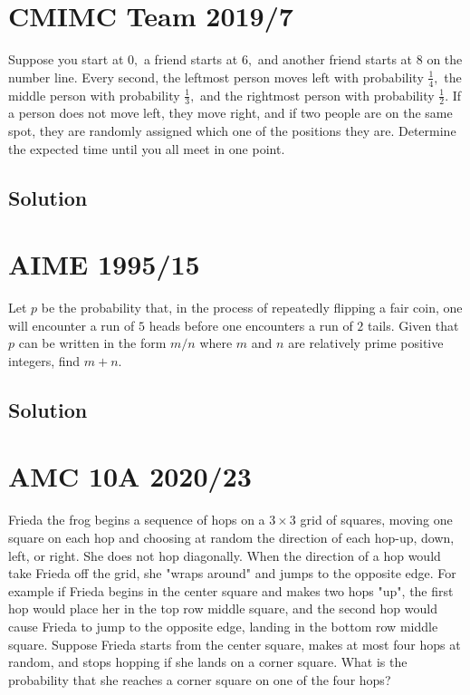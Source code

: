 \documentclass{article}
\begin{document}
\pagebreak\section{CMIMC Team 2019/7} Suppose you start at $0,$ a friend starts at $6,$ and another friend starts at $8$ on the number line. Every second, the leftmost person moves left with probability $\frac{1}{4},$ the middle person with probability $\frac{1}{3},$ and the rightmost person with probability $\frac{1}{2}.$ If a person does not move left, they move right, and if two people are on the same spot, they are randomly assigned which one of the positions they are. Determine the expected time until you all meet in one point.
\subsection{Solution}    




\pagebreak\section{AIME 1995/15} Let $p$ be the probability that, in the process of repeatedly flipping a fair coin, one will encounter a run of $5$ heads before one encounters a run of $2$ tails. Given that $p$ can be written in the form $m/n$ where $m$ and $n$ are relatively prime positive integers, find $m+n$.
\subsection{Solution}

\pagebreak\section{AMC 10A 2020/23}

Frieda the frog begins a sequence of hops on a $3 \times 3$ grid of squares, moving one square on each hop and choosing at random the direction of each hop-up, down, left, or right. She does not hop diagonally. When the direction of a hop would take Frieda off the grid, she "wraps around" and jumps to the opposite edge. For example if Frieda begins in the center square and makes two hops "up", the first hop would place her in the top row middle square, and the second hop would cause Frieda to jump to the opposite edge, landing in the bottom row middle square. Suppose Frieda starts from the center square, makes at most four hops at random, and stops hopping if she lands on a corner square. What is the probability that she reaches a corner square on one of the four hops?
\end{document}
